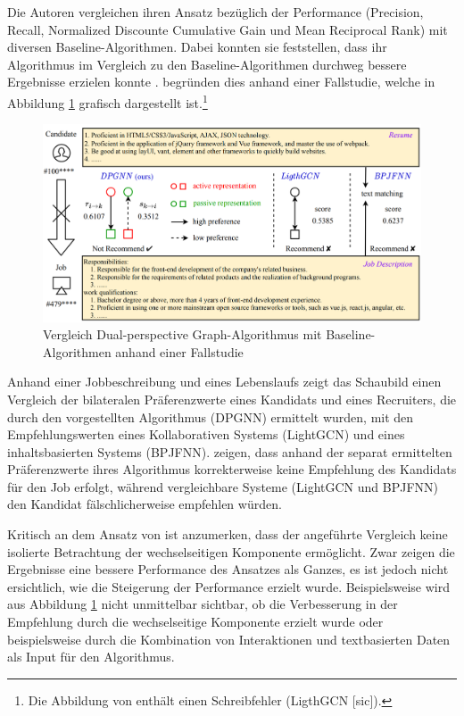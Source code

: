 Die Autoren vergleichen ihren Ansatz bezüglich der Performance (Precision, Recall, Normalized Discounte Cumulative Gain und Mean Reciprocal Rank) mit diversen Baseline-Algorithmen.
Dabei konnten sie feststellen, dass ihr Algorithmus im Vergleich zu den Baseline-Algorithmen durchweg bessere Ergebnisse erzielen konnte \cite[S. 110]{yang:inproceedings}.
\textcite[S. 110]{yang:inproceedings} begründen dies anhand einer Fallstudie, welche in Abbildung \ref{fig:relatedwork:abb4} grafisch dargestellt ist.\footnote{Die Abbildung von \textcite[S. 111]{yang:inproceedings} enthält einen Schreibfehler (LigthGCN [sic]).}
\begin{figure}[H]
    \centering
	\includegraphics[width=1.0\textwidth]{gfx/dpg-case-study.png}
	\caption[Vergleich dual-perspective Graph-Algorithmus mit Baseline-Algorithmen anhand einer Fallstudie]{Vergleich Dual-perspective Graph-Algorithmus mit Baseline-Algo\-rithmen anhand einer Fallstudie\\
    \cite[S. 111]{yang:inproceedings}}
	\label{fig:relatedwork:abb4}
\end{figure}
Anhand einer Jobbeschreibung und eines Lebenslaufs zeigt das Schaubild einen Vergleich der bilateralen Präferenzwerte eines Kandidats und eines Recruiters, die durch den vorgestellten Algorithmus (DPGNN) ermittelt wurden, mit den Empfehlungswerten eines Kollaborativen Systems (LightGCN) und eines inhaltsbasierten Systems (BPJFNN).
\textcite[S. 110]{yang:inproceedings} zeigen, dass anhand der separat ermittelten Präferenzwerte ihres Algorithmus korrekterweise keine Empfehlung des Kandidats für den Job erfolgt, während vergleichbare Systeme (LightGCN und BPJFNN) den Kandidat fälschlicherweise empfehlen würden.

Kritisch an dem Ansatz von \textcite[S. 102ff.]{yang:inproceedings} ist anzumerken, dass der angeführte Vergleich keine isolierte Betrachtung der wechselseitigen Komponente ermöglicht.
Zwar zeigen die Ergebnisse eine bessere Performance des Ansatzes als Ganzes, es ist jedoch nicht ersichtlich, wie die Steigerung der Performance erzielt wurde.
Beispielsweise wird aus Abbildung \ref{fig:relatedwork:abb4} nicht unmittelbar sichtbar, ob die Verbesserung in der Empfehlung durch die wechselseitige Komponente erzielt wurde oder beispielsweise durch die Kombination von Interaktionen und textbasierten Daten als Input für den Algorithmus.

